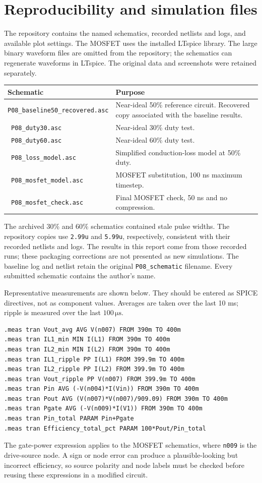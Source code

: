 \documentclass[11pt,a4paper]{article}
\newcommand{\unit}[1]{\,\mathrm{#1}}
\begin{document}
\section{Reproducibility and simulation files}
The repository contains the named schematics, recorded netlists and logs, and available plot settings. The MOSFET uses the installed LTspice library. The large binary waveform files are omitted from the repository; the schematics can regenerate waveforms in LTspice. The original data and screenshots were retained separately.

{\small\begin{tabularx}{\linewidth}{@{}p{.49\linewidth}X@{}}\toprule
Schematic & Purpose \\\midrule
\texttt{P08\_baseline50\_recovered.asc} & Near-ideal 50\% reference circuit. Recovered copy associated with the baseline results. \\\
\texttt{P08\_duty30.asc} & Near-ideal 30\% duty test. \\\
\texttt{P08\_duty60.asc} & Near-ideal 60\% duty test. \\\
\texttt{P08\_loss\_model.asc} & Simplified conduction-loss model at 50\% duty. \\\
\texttt{P08\_mosfet\_model.asc} & MOSFET substitution, 100 ns maximum timestep. \\\
\texttt{P08\_mosfet\_check.asc} & Final MOSFET check, 50 ns and no compression. \\\bottomrule
\end{tabularx}}

The archived 30\% and 60\% schematics contained stale pulse widths. The repository copies use \texttt{2.99u} and \texttt{5.99u}, respectively, consistent with their recorded netlists and logs. The results in this report come from those recorded runs; these packaging corrections are not presented as new simulations. The baseline log and netlist retain the original \texttt{P08\_schematic} filename. Every submitted schematic contains the author's name.

Representative measurements are shown below. They should be entered as SPICE directives, not as component values. Averages are taken over the last 10 ms; ripple is measured over the last $100\unit{\mu s}$.
\begin{verbatim}
.meas tran Vout_avg AVG V(n007) FROM 390m TO 400m
.meas tran IL1_min MIN I(L1) FROM 390m TO 400m
.meas tran IL2_min MIN I(L2) FROM 390m TO 400m
.meas tran IL1_ripple PP I(L1) FROM 399.9m TO 400m
.meas tran IL2_ripple PP I(L2) FROM 399.9m TO 400m
.meas tran Vout_ripple PP V(n007) FROM 399.9m TO 400m
.meas tran Pin AVG (-V(n004)*I(Vin)) FROM 390m TO 400m
.meas tran Pout AVG (V(n007)*V(n007)/909.09) FROM 390m TO 400m
.meas tran Pgate AVG (-V(n009)*I(V1)) FROM 390m TO 400m
.meas tran Pin_total PARAM Pin+Pgate
.meas tran Efficiency_total_pct PARAM 100*Pout/Pin_total
\end{verbatim}
The gate-power expression applies to the MOSFET schematics, where \texttt{n009} is the drive-source node. A sign or node error can produce a plausible-looking but incorrect efficiency, so source polarity and node labels must be checked before reusing these expressions in a modified circuit.
\end{document}
